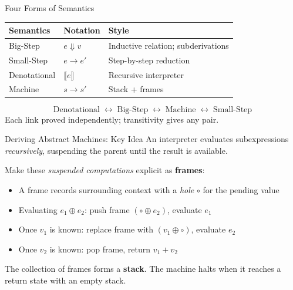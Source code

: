 \documentclass[10pt,compress,aspectratio=169]{beamer}
\begin{document}
\begin{frame}{Four Forms of Semantics}
  \begin{center}
  \renewcommand{\arraystretch}{1.4}
  \begin{tabular}{lll}
    \toprule
    \textbf{Semantics} & \textbf{Notation} & \textbf{Style} \\
    \midrule
    Big-Step     & $e \Downarrow v$   & Inductive relation; subderivations \\
    Small-Step   & $e \longrightarrow e'$ & Step-by-step reduction \\
    Denotational & $\llbracket e \rrbracket$ & Recursive interpreter \\
    Machine      & $s \longrightarrow s'$ & Stack + frames \\
    \bottomrule
  \end{tabular}
  \end{center}
  \bigskip
  \[
    \text{Denotational}
    \;\longleftrightarrow\;
    \text{Big-Step}
    \;\longleftrightarrow\;
    \text{Machine}
    \;\longleftrightarrow\;
    \text{Small-Step}
  \]
  Each link proved independently; transitivity gives any pair.
\end{frame}

\begin{frame}{Deriving Abstract Machines: Key Idea}
  An interpreter evaluates subexpressions \emph{recursively}, suspending the parent until the result is available.

  \bigskip
  Make these \emph{suspended computations} explicit as \textbf{frames}:
  \begin{itemize}
    \item A frame records surrounding context with a \emph{hole} $\circ$ for the pending value
    \item Evaluating $e_1 \oplus e_2$: push frame $(\circ \oplus e_2)$, evaluate $e_1$
    \item Once $v_1$ is known: replace frame with $(v_1 \oplus \circ)$, evaluate $e_2$
    \item Once $v_2$ is known: pop frame, return $v_1 + v_2$
  \end{itemize}

  \bigskip
  The collection of frames forms a \textbf{stack}.
  The machine halts when it reaches a return state with an empty stack.
\end{frame}
\end{document}
